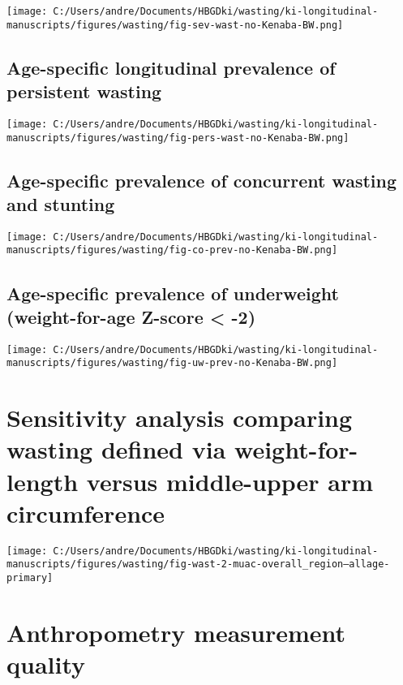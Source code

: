 \documentclass[
  9pt,
]{book}
\begin{document}
\texttt{[image: C:/Users/andre/Documents/HBGDki/wasting/ki-longitudinal-manuscripts/figures/wasting/fig-sev-wast-no-Kenaba-BW.png]}

\hypertarget{age-specific-longitudinal-prevalence-of-persistent-wasting-2}{%
\section{Age-specific longitudinal prevalence of persistent wasting}\label{age-specific-longitudinal-prevalence-of-persistent-wasting-2}}

\texttt{[image: C:/Users/andre/Documents/HBGDki/wasting/ki-longitudinal-manuscripts/figures/wasting/fig-pers-wast-no-Kenaba-BW.png]}

\hypertarget{age-specific-prevalence-of-concurrent-wasting-and-stunting-2}{%
\section{Age-specific prevalence of concurrent wasting and stunting}\label{age-specific-prevalence-of-concurrent-wasting-and-stunting-2}}

\texttt{[image: C:/Users/andre/Documents/HBGDki/wasting/ki-longitudinal-manuscripts/figures/wasting/fig-co-prev-no-Kenaba-BW.png]}

\hypertarget{age-specific-prevalence-of-underweight-weight-for-age-z-score--2-1}{%
\section{Age-specific prevalence of underweight (weight-for-age Z-score \textless{} -2)}\label{age-specific-prevalence-of-underweight-weight-for-age-z-score--2-1}}

\texttt{[image: C:/Users/andre/Documents/HBGDki/wasting/ki-longitudinal-manuscripts/figures/wasting/fig-uw-prev-no-Kenaba-BW.png]}

\hypertarget{muac}{%
\chapter{Sensitivity analysis comparing wasting defined via weight-for-length versus middle-upper arm circumference}\label{muac}}

\raggedright

\texttt{[image: C:/Users/andre/Documents/HBGDki/wasting/ki-longitudinal-manuscripts/figures/wasting/fig-wast-2-muac-overall\_region--allage-primary]}

\hypertarget{anthro}{%
\chapter{Anthropometry measurement quality}\label{anthro}}
\end{document}
